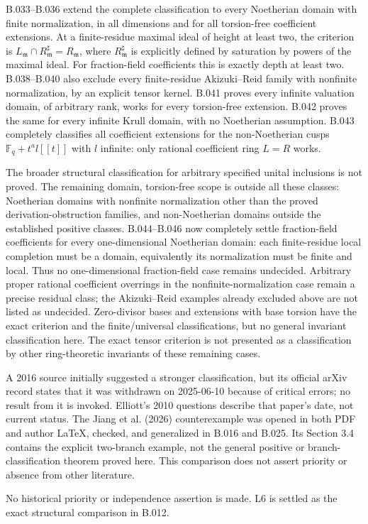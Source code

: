 B.033--B.036 extend the complete classification to every Noetherian
domain with finite normalization, in all dimensions and for all
torsion-free coefficient extensions. At a finite-residue maximal
ideal of height at least two, the criterion is
$L_{\mathfrak m}\cap R_{\mathfrak m}^{\sharp}=R_{\mathfrak m}$,
where $R_{\mathfrak m}^{\sharp}$ is explicitly defined by saturation
by powers of the maximal ideal. For fraction-field coefficients
this is exactly depth at least two. B.038--B.040 also exclude every
finite-residue Akizuki--Reid family with nonfinite normalization,
by an explicit tensor kernel. B.041 proves every infinite valuation
domain, of arbitrary rank, works for every torsion-free extension.
B.042 proves the same for every infinite Krull domain, with no
Noetherian assumption. B.043 completely classifies all coefficient
extensions for the non-Noetherian cusps $\mathbb F_q+t^a l[[t]]$
with $l$ infinite: only rational coefficient ring $L=R$ works.

The broader structural classification for arbitrary specified unital
inclusions is not proved. The remaining domain, torsion-free scope
is outside all these classes: Noetherian domains with nonfinite
normalization other than the proved derivation-obstruction families,
and non-Noetherian domains outside the established positive classes.
B.044--B.046 now completely settle fraction-field coefficients
for every one-dimensional Noetherian domain: each finite-residue
local completion must be a domain, equivalently its normalization
must be finite and local. Thus no one-dimensional fraction-field
case remains undecided. Arbitrary proper rational coefficient
overrings in the nonfinite-normalization case remain a precise
residual class; the Akizuki--Reid examples already excluded above
are not listed as undecided. Zero-divisor bases and extensions with base
torsion have the exact criterion and the finite/universal
classifications, but no general invariant classification here.
The exact tensor criterion is not presented as a classification by
other ring-theoretic invariants of these remaining cases.

A 2016 source initially suggested a stronger classification, but its
official arXiv record states that it was withdrawn on 2025-06-10
because of critical errors; no result from it is invoked. Elliott's
2010 questions describe that paper's date, not current status. The
Jiang et al. (2026) counterexample was opened in both PDF and author
LaTeX, checked, and generalized in B.016 and B.025. Its Section 3.4
contains the explicit two-branch example, not the general positive or
branch-classification theorem proved here. This comparison does not
assert priority or absence from other literature.

No historical priority or independence assertion is made. L6 is
settled as the exact structural comparison in B.012.
